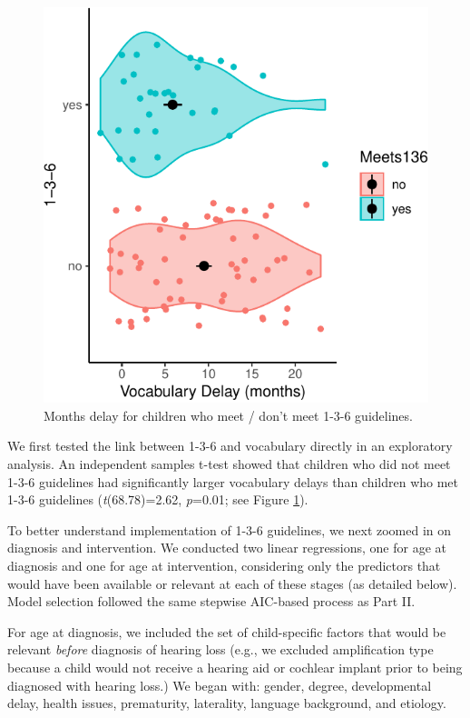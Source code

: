 \documentclass[
  english,
  man]{apa6}
\begin{document}
\begin{figure}
\centering
\includegraphics{ELSSP_paper_files/figure-latex/delay-violins-1.pdf}
\caption{\label{fig:delay-violins}Months delay for children who meet / don't meet 1-3-6 guidelines.}
\end{figure}

We first tested the link between 1-3-6 and vocabulary directly in an exploratory analysis. An independent samples t-test showed that children who did not meet 1-3-6 guidelines had significantly larger vocabulary delays than children who met 1-3-6 guidelines (\emph{t}(68.78)=2.62, \emph{p}=0.01; see Figure \ref{fig:delay-violins}).

To better understand implementation of 1-3-6 guidelines, we next zoomed in on diagnosis and intervention. We conducted two linear regressions, one for age at diagnosis and one for age at intervention, considering only the predictors that would have been available or relevant at each of these stages (as detailed below). Model selection followed the same stepwise AIC-based process as Part II.

For age at diagnosis, we included the set of child-specific factors that would be relevant \emph{before} diagnosis of hearing loss (e.g., we excluded amplification type because a child would not receive a hearing aid or cochlear implant prior to being diagnosed with hearing loss.) We began with: gender, degree, developmental delay, health issues, prematurity, laterality, language background, and etiology.
\end{document}

